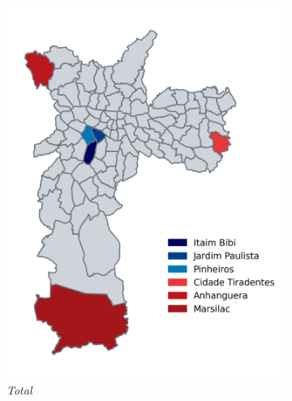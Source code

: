 \documentclass[12pt,a4paper]{article}
\theoremstyle{break}
\begin{document}
\begin{figure}[htbp]
  \centering
  \begin{subfigure}[b]{0.32\textwidth}
    \includegraphics[width=\textwidth]{q2_a.png}
    \caption*{\emph{Total}}
  \end{subfigure}
  \hfill %
  \begin{subfigure}[b]{0.32\textwidth}

\end{subfigure}
\end{figure}
\end{document}
